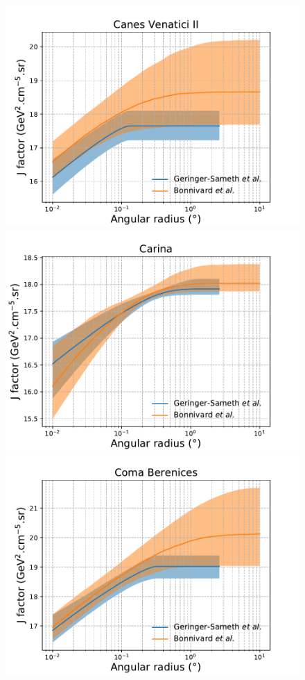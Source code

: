 \begin{figure}[ht]
{    \includegraphics[scale=0.32]{figures/glory_duck/appendix/CanesVenaticiII.pdf}
    \includegraphics[scale=0.32]{figures/glory_duck/appendix/Carina.pdf}
    \includegraphics[scale=0.32]{figures/glory_duck/appendix/ComaBerenices.pdf}
}
\end{figure}
